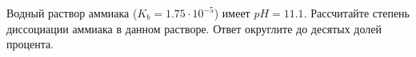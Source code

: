 
Водный раствор аммиака ($K_b= 1.75 \cdot 10^{-5}$) имеет $pH=11.1$. Рассчитайте степень 
диссоциации аммиака в данном растворе. Ответ округлите до десятых долей процента.



